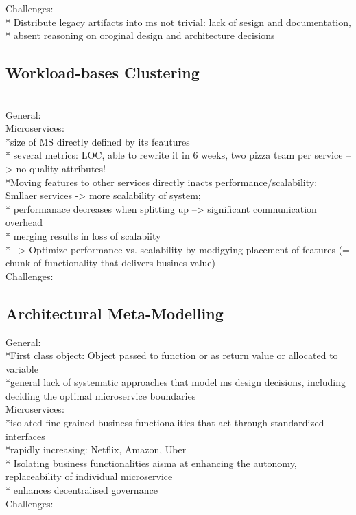 Challenges:\\
* Distribute legacy artifacts into ms not trivial: lack of sesign and documentation, \\
* absent reasoning on oroginal design and architecture decisions\\ 

\subsection{Workload-bases Clustering}
\cite{WorkloadbasedClustering} \\

General: \\

Microservices: \\
*size of MS directly defined by its feautures\\
* several metrics: LOC, able to rewrite it in 6 weeks,  two pizza team per service --> no quality attributes!\\
*Moving features to other services directly inacts performance/scalability:  Smllaer services -> more scalability of system; \\
* performanace decreases when splitting up --> significant communication overhead \\
* merging results in loss of scalabiity\\
* --> Optimize performance vs. scalability by modigying placement of features (= chunk of functionality that delivers busines value)\\


Challenges:\\


\subsection{Architectural Meta-Modelling}
\cite{ArchitecturalMetaModelling}


General:\\
*First class object: Object passed to function or as return value  or  allocated to variable\\
*general lack of systematic approaches that model ms design decisions, including deciding the optimal microservice boundaries\\

Microservices:\\
*isolated fine-grained business functionalities that act through standardized interfaces\\
*rapidly increasing: Netflix, Amazon, Uber\\
* Isolating business functionalities aisma at enhancing the autonomy, replaceability of individual microservice\\
* enhances decentralised governance\\



Challenges:\\



